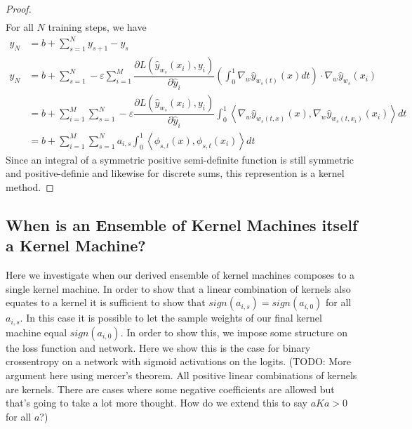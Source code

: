 \begin{proof}
\begin{align}
\end{align}
For all $N$ training steps, we have
\begin{align}
y_N &= b + \sum_{s=1}^N y_{s+1} - y_s\\
y_N &= b + \sum_{s = 1}^N -\varepsilon \sum_{i = 1}^{M} \dfrac{\partial L(\hat y_{w_s}(x_i),  y_i)}{\partial \hat y_i}  \left(\int_0^1\nabla_w \hat y_{w_s(t)}(x)dt\right) \cdot \nabla_w \hat y_{w_s}(x_i)\\
&= b + \sum_{i = 1}^{M}\sum_{s = 1}^N -\varepsilon  \dfrac{\partial L(\hat y_{w_s}(x_i),  y_i)}{\partial \hat y_i}  \int_0^1\left\langle \nabla_w \hat y_{w_s(t,x)}(x), \nabla_w \hat y_{w_s(t,x_i)}(x_i) \right\rangle dt\\ 
&= b + \sum_{i = 1}^{M}\sum_{s = 1}^N a_{i, s}  \int_0^1 \left\langle \phi_{s,t}(x), \phi_{s,t}(x_i)\right\rangle dt
\end{align}
Since an integral of a symmetric positive semi-definite function is still symmetric and positive-definie and likewise for discrete sums, this represention is a kernel method. 

\end{proof}
\subsection{When is an Ensemble of Kernel Machines itself a Kernel Machine?}
Here we investigate when our derived ensemble of kernel machines composes to a single kernel machine.
In order to show that a linear combination of kernels also equates to a kernel it is sufficient to show that $sign(a_{i,s}) = sign(a_{i,0})$ for all $a_{i,s}$. 
In this case it is possible to let the sample weights of our final kernel machine equal $sign(a_{i,0})$.
In order to show this, we impose some structure on the loss function and network.
Here we show this is the case for binary crossentropy on a network with sigmoid activations on the logits.
(TODO: More argument here using mercer's theorem. All positive linear combinations of kernels are kernels. There are cases where some negative coefficients are allowed but that's going to take a lot more thought. How do we extend this to say $aKa > 0$ for all $a$?)

